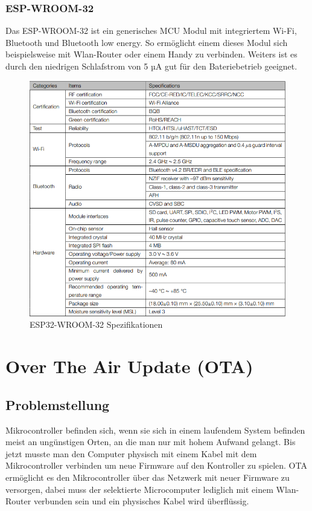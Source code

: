 \subsubsection{ESP-WROOM-32}\label{sec:esp-wroom-32}

Das ESP-WROOM-32 ist ein generisches MCU Modul mit integriertem Wi-Fi, Bluetooth und Bluetooth low energy. So ermöglicht einem dieses Modul sich beispielsweise mit Wlan-Router oder einem Handy zu verbinden. Weiters ist es durch den niedrigen Schlafstrom von 5 µA gut für den Bateriebetrieb geeignet.

\begin{figure}[H]
    \begin{center}
        \includegraphics[scale=0.78]{images/esp32-wroom-32.png}
        \caption{ESP32-WROOM-32 Spezifikationen\cite{esp32-wroom-32_secifications}}
    \end{center}
\end{figure}

\section{Over The Air Update (OTA)}\label{sec:ota}

\subsection*{Problemstellung}\label{sec:problem}
Mikrocontroller befinden sich, wenn sie sich in einem laufendem System befinden meist an ungünstigen Orten, an die man nur mit hohem Aufwand gelangt.
Bis jetzt musste man den Computer physisch mit einem Kabel mit dem Mikrocontroller verbinden um neue Firmware auf den Kontroller zu spielen.
OTA ermöglicht es den Mikrocontroller über das Netzwerk mit neuer Firmware zu versorgen, dabei muss der selektierte Microcomputer lediglich mit einem Wlan-Router verbunden sein und ein physisches Kabel wird überflüssig.

